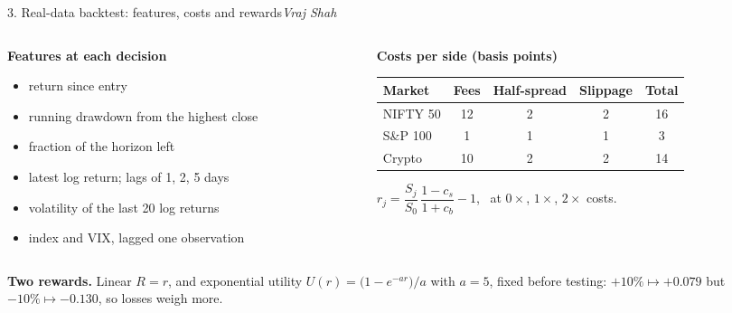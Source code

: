 \documentclass[aspectratio=169,11pt]{beamer}
\newcommand{\by}[1]{\hfill{\normalfont\small\itshape #1}}
\begin{document}
\begin{frame}{3. Real-data backtest: features, costs and rewards\by{Vraj Shah}}
\begin{columns}[T]
\begin{column}{.43\textwidth}
\small\textbf{Features at each decision}
\begin{itemize}\footnotesize
\item return since entry
\item running drawdown from the highest close
\item fraction of the horizon left
\item latest log return; lags of 1, 2, 5 days
\item volatility of the last 20 log returns
\item index and VIX, lagged one observation
\end{itemize}
\end{column}
\begin{column}{.55\textwidth}
\small\textbf{Costs per side (basis points)}\\[3pt]
\footnotesize
\begin{tabular}{lcccc}
\toprule
Market & Fees & Half-spread & Slippage & Total\\
\midrule
NIFTY 50 & 12 & 2 & 2 & 16\\
S\&P 100 & 1 & 1 & 1 & 3\\
Crypto & 10 & 2 & 2 & 14\\
\bottomrule
\end{tabular}

\vspace{4pt}
$r_j=\dfrac{S_j}{S_0}\,\dfrac{1-c_s}{1+c_b}-1$, \ at $0\times$, $1\times$, $2\times$ costs.
\end{column}
\end{columns}

\vspace{8pt}
\small\textbf{Two rewards.} Linear $R=r$, and exponential utility $U(r)=\big(1-e^{-ar}\big)/a$ with
$a=5$, fixed before testing: $+10\%\mapsto+0.079$ but $-10\%\mapsto-0.130$, so losses weigh more.
\end{frame}
\end{document}
